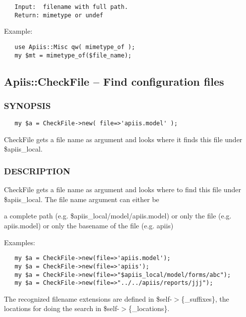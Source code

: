 \begin{verbatim}
   Input:  filename with full path.
   Return: mimetype or undef
\end{verbatim}


Example:

\begin{verbatim}
   use Apiis::Misc qw( mimetype_of );
   my $mt = mimetype_of($file_name);
\end{verbatim}
\subsection{Apiis::CheckFile -- Find configuration files\label{Apiis::CheckFile_--_Find_configuration_files}}




\subsubsection*{SYNOPSIS\label{Apiis::CheckFile_--_Find_configuration_files_SYNOPSIS}}
\begin{verbatim}
   my $a = CheckFile->new( file=>'apiis.model' );
\end{verbatim}


CheckFile gets a file name as argument and looks where it finds this file
under \$apiis\_local.

\subsubsection*{DESCRIPTION\label{Apiis::CheckFile_--_Find_configuration_files_DESCRIPTION}}


CheckFile gets a file name as argument and looks where to find this file
under \$apiis\_local.
The file name argument can either be



a complete path (e.g.  \$apiis\_local/model/apiis.model)
or only the file (e.g. apiis.model)
or only the basename of the file (e.g. apiis)



Examples:

\begin{verbatim}
   my $a = CheckFile->new(file=>'apiis.model'); 
   my $a = CheckFile->new(file=>'apiis'); 
   my $a = CheckFile->new(file=>"$apiis_local/model/forms/abc");
   my $a = CheckFile->new(file=>"../../apiis/reports/jjj");
\end{verbatim}


The recognized filename extensions are defined in \$self-$>$\{\_suffixes\},
the locations for doing the search in \$self-$>$\{\_locations\}.

